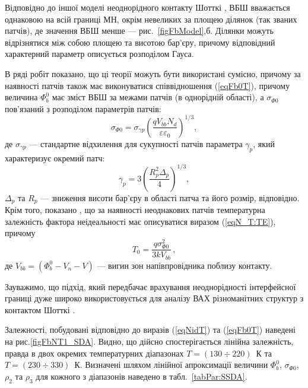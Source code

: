 Відповідно до іншої моделі неоднорідного контакту Шотткі \cite{Sullivan,Tung:PhysRev,Tung:MSE,Tung:ApplPhysRev}, ВБШ вважається однаковою на всій границі МН,
окрім невеликих за площею ділянок (так званих патчів), де значення ВБШ менше --- рис.~\ref{figFbModel},б.
Ділянки можуть відрізнятися між собою площею та висотою бар'єру, причому відповідний характерний параметр описується розподілом Гауса.

В ряді робіт \cite{Iucolano2007JAP, Iucolano2007APL} показано, що ці теорії можуть бути використані сумісно,
причому за наявності патчів також має виконуватися співвідношення (\ref{eqFb0T}),
причому величина $\Phi_b^0$ має зміст ВБШ за межами патчів (в однорідній області),
а $\sigma_{\Phi0}$ пов'язаний з розподілом параметрів патчів:
\begin{equation}\label{eqGigFSigG}
  \sigma_{\Phi0}=\sigma_{\gamma p}\left(\frac{qV_{bb}N_d}{\varepsilon\varepsilon_0}\right)^{1/3},
\end{equation}
де
$\sigma_{\gamma p}$ --- стандартне відхилення для сукупності патчів параметра $\gamma_p$, який
характеризує окремий патч:
\begin{equation}\label{eqGammaP}
  \gamma_p=3\left(\frac{R_p^2\Delta_p}{4}\right)^{1/3},
\end{equation}
$\Delta_p$ та $R_p$ --- зниження висоти бар'єру в області патча та його розмір, відповідно.
Крім того, показано \cite{Sullivan,Tung:PhysRev,Iucolano2007JAP, Iucolano2007APL}, що за наявності неоднакових патчів
температурна залежність фактора неідеальності має описуватися виразом (\ref{eqN_T:TE}), причому
\begin{equation} \label{eqN_T0}
T_0=\frac{q\sigma_{\Phi0}^2}{3kV_{bb}}\,,
\end{equation}
де
$V_{bb}=(\Phi_b^0-V_n-V)$ --- вигин зон напівпровідника поблизу контакту.

Зауважимо, що підхід, який передбачає  врахування неоднорідності
інтерфейсної границі дуже широко використовується  для аналізу ВАХ різноманітних структур з контактом Шотткі
\cite{Soylu,GELCZUK2014,Mohan,JYOTHI2015,DURMUS2014,KHURE2015,OZAVCI2013,Cetin2005,Karatas:2006NIMA,Sarpatwari,
Tascioglu2010,Yildirim2010,Mamor,Iucolano2007JAP,Iucolano2007APL,Li2016}.

Залежності, побудовані відповідно до виразів (\ref{eqNidT}) та (\ref{eqFb0T}) наведені на рис.\ref{figFbNT1_SDA}.
Видно, що дійсно спостерігається лінійна залежність,
правда в двох окремих температурних діапазонах $T=(130\div220)$~К та $T=(230\div330)$~К.
Визначені шляхом лінійної апроксимації величини $\Phi_{b}^0$, $\sigma_{\Phi0}$, $\rho_2$ та $\rho_3$ для кожного з діапазонів
наведено в табл.~\ref{tabPar:SSDA}.

